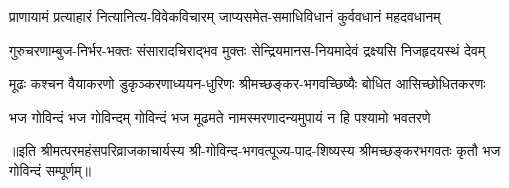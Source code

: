 \begin{large}
\begin{multicols}{2}
\begin{flushleft}
\fourlineindentedshloka
{प्राणायामं प्रत्याहारं}
{नित्यानित्य-विवेकविचारम्}
{जाप्यसमेत-समाधिविधानं}
{कुर्ववधानं महदवधानम्}

\fourlineindentedshloka
{गुरुचरणाम्बुज-निर्भर-भक्तः}
{संसारादचिराद्भव मुक्तः}
{सेन्द्रियमानस-नियमादेवं}
{द्रक्ष्यसि निजहृदयस्थं देवम्}

\fourlineindentedshloka
{मूढः कश्चन वैयाकरणो}
{डुकृञ्करणाध्ययन-धुरिणः}
{श्रीमच्छङ्कर-भगवच्छिष्यैः}
{बोधित आसिच्छोधितकरणः}

\fourlineindentedshloka
{भज गोविन्दं भज गोविन्दम्}
{गोविन्दं भज मूढमते}
{नामस्मरणादन्यमुपायं}
{न हि पश्यामो भवतरणे}

\fourlineshloka{}{}{}{}
\fourlineshloka{}{}{}{}
\end{flushleft}
\end{multicols}
॥इति श्रीमत्परमहंसपरिव्राजकाचार्यस्य श्री-गोविन्द-भगवत्पूज्य-पाद-शिष्यस्य
श्रीमच्छङ्करभगवतः कृतौ भज गोविन्दं सम्पूर्णम्॥
\end{large}
\setlength{\shlokaspaceskip}{24pt}
\setlength{\columnseprule}{1pt}
\setlength{\columnsep}{30pt}